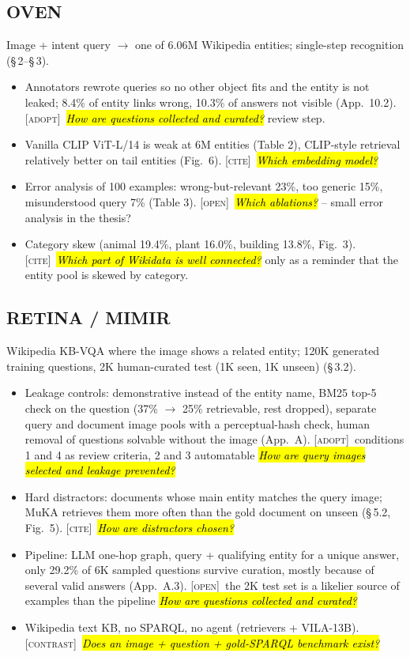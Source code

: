 \documentclass[10pt,a4paper]{article}
\newcommand{\adopt}{\textsc{[adopt]}}
\newcommand{\contrast}{\textsc{[contrast]}}
\newcommand{\cit}{\textsc{[cite]}}
\newcommand{\open}{\textsc{[open]}}
\newcommand{\q}[1]{\hl{\footnotesize\itshape #1}}
\begin{document}
\subsection*{OVEN \cite{hu2023open}}
Image + intent query $\to$ one of 6.06M Wikipedia entities;
single-step recognition (\S\,2--\S\,3).
\begin{itemize}
  \item Annotators rewrote queries so no other object fits and the
    entity is not leaked; 8.4\% of entity links wrong, 10.3\% of
    answers not visible (App.~10.2). \adopt\ \q{How are questions
    collected and curated?} review step.
  \item Vanilla CLIP ViT-L/14 is weak at 6M entities (Table 2),
    CLIP-style retrieval relatively better on tail entities (Fig.~6).
    \cit\ \q{Which embedding model?}
  \item Error analysis of 100 examples: wrong-but-relevant 23\%, too
    generic 15\%, misunderstood query 7\% (Table 3). \open\ \q{Which
    ablations?} -- small error analysis in the thesis?
  \item Category skew (animal 19.4\%, plant 16.0\%, building 13.8\%,
    Fig.~3). \cit\ \q{Which part of Wikidata is well connected?} only as
    a reminder that the entity pool is skewed by category.
\end{itemize}

\subsection*{RETINA / MIMIR \cite{lee2025breaking}}
Wikipedia KB-VQA where the image shows a related entity; 120K
generated training questions, 2K human-curated test (1K seen, 1K
unseen) (\S\,3.2).
\begin{itemize}
  \item Leakage controls: demonstrative instead of the entity name,
    BM25 top-5 check on the question (37\% $\to$ 25\% retrievable,
    rest dropped), separate query and document image pools with a
    perceptual-hash check, human removal of questions solvable
    without the image (App.~A). \adopt\ conditions 1 and 4 as review
    criteria, 2 and 3 automatable \q{How are query images selected
    and leakage prevented?}
  \item Hard distractors: documents whose main entity matches the
    query image; MuKA retrieves them more often than the gold
    document on unseen (\S\,5.2, Fig.~5). \cit\ \q{How are distractors chosen?}
  \item Pipeline: LLM one-hop graph, query + qualifying entity for a
    unique answer, only 29.2\% of 6K sampled questions survive
    curation, mostly because of several valid answers (App.~A.3).
    \open\ the 2K test set is a likelier source of examples than the
    pipeline \q{How are questions collected and curated?}
  \item Wikipedia text KB, no SPARQL, no agent (retrievers +
    VILA-13B). \contrast\ \q{Does an image + question + gold-SPARQL
    benchmark exist?}
\end{itemize}
\end{document}
